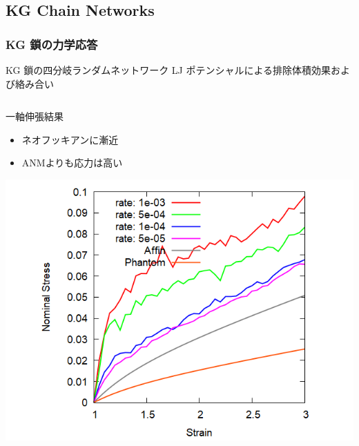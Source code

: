 \documentclass[12pt, dvipdfmx]{beamer}
\begin{document}
\subsection{KG Chain Networks}
\begin{frame}
	\frametitle{KG 鎖の力学応答}
	\vspace{-3mm}
	\begin{alertblock}{KG 鎖の四分岐ランダムネットワーク}
		LJ ポテンシャルによる排除体積効果および絡み合い
	\end{alertblock}
	\vspace{-4mm}
	\begin{columns}[T, onlytextwidth]
			\begin{block}{一軸伸張結果}
				\begin{itemize}
					\item ネオフッキアンに漸近
					\item ANMよりも応力は高い
				\end{itemize}
				\includegraphics[width=\textwidth]{N48_C4_M3.png}
			\end{block}
			

\end{columns}
\end{frame}
\end{document}
